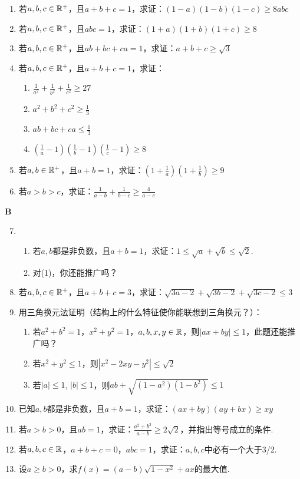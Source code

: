 \begin{enumerate}
    \item 若$a,b,c\in\mathbb{R}^+$，且$a+b+c=1$，求证：$(1-a)(1-b)(1-c)\ge 8abc$
    \item 若$a,b,c\in\mathbb{R}^+$，且$abc=1$，求证：$(1+a)(1+b)(1+c)\ge 8$
    \item 若$a,b,c\in\mathbb{R}^+$，且$ab+bc+ca=1$，求证：$a+b+c\ge \sqrt{3}$
    \item 若$a,b,c\in\mathbb{R}^+$，且$a+b+c=1$，求证：
\begin{enumerate}[(1)]
    \item $\frac{1}{a^2}+\frac{1}{b^2}+\frac{1}{c^2}\ge 27$
    \item $a^2+b^2+c^2\ge \frac{1}{3}$
    \item $ab+bc+ca\le \frac{1}{3}$
    \item $\left(\frac{1}{a}-1\right)\left(\frac{1}{b}-1\right)\left(\frac{1}{c}-1\right)\ge 8$
\end{enumerate}    
    \item 若$a,b\in\mathbb{R}^+$，且$a+b=1$，求证：$\left(1+\frac{1}{a}\right)\left(1+\frac{1}{b}\right)\ge 9$
    \item 若$a>b>c$，求证：$\frac{1}{a-b}+\frac{1}{b-c}\ge \frac{4}{a-c}$
\end{enumerate}

\begin{center}
    \bfseries B
\end{center}

\begin{enumerate}
 \setcounter{enumi}{6}   
 \item \begin{enumerate}[(1)]
     \item 若$a,b$都是非负数，且$a+b=1$，求证：$1\le \sqrt{a}+\sqrt{b}\le \sqrt{2}$.
     \item 对(1)，你还能推广吗？
 \end{enumerate}
 \item 若$a,b,c\in\mathbb{R}^+$，且$a+b+c=3$，求证：$\sqrt{3a-2}+\sqrt{3b-2}+\sqrt{3c-2}\le 3$
 \item 用三角换元法证明（结构上的什么特征使你能联想到三角换元？）：
 \begin{enumerate}[(1)]
     \item 若$a^2+b^2=1$，$x^2+y^2=1$，$a,b,x,y\in\mathbb{R}$，则$|ax+by|\le 1$，此题还能推广吗？
     \item 若$x^2+y^2\le 1$，则$|x^2-2xy-y^2|\le \sqrt{2}$
     \item 若$|a|\le 1$, $|b|\le 1$，则$ab+\sqrt{(1-a^2)(1-b^2)}\le 1$
 \end{enumerate}

\item 已知$a,b$都是非负数，且$a+b=1$，求证：$(ax+by)(ay+bx)\ge xy$
\item 若$a>b>0$，且$ab=1$，求证：$\frac{a^2+b^2}{a-b}\ge 2\sqrt{2}$，并指出等号成立的条件.
\item 若$a,b,c\in\mathbb{R}$，$a+b+c=0$，$abc=1$，求证：$a,b,c$中必有一个大于3/2.
\item 设$a\ge b>0$，求$f(x)=(a-b)\sqrt{1-x^2}+ax$的最大值.
\end{enumerate}

